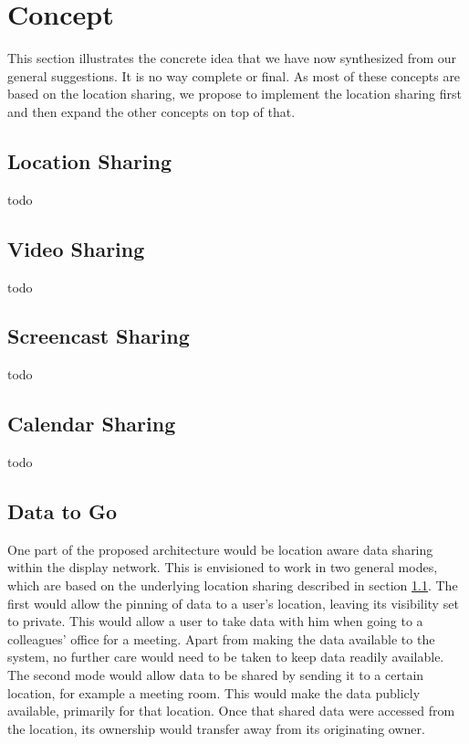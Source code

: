 \section{Concept}

This section illustrates the concrete idea that we have now synthesized from our general suggestions.
It is no way complete or final.
As most of these concepts are based on the location sharing, we propose to implement the location sharing first and then expand the other concepts on top of that.

\subsection{Location Sharing}
\label{location_sharing}

todo

\subsection{Video Sharing}

todo

\subsection{Screencast Sharing}

todo

\subsection{Calendar Sharing}

todo

\subsection{Data to Go}
\label{data2go}

One part of the proposed architecture would be location aware data sharing within the display network.
This is envisioned to work in two general modes, which are based on the underlying location sharing described in section \ref{location_sharing}.
The first would allow the pinning of data to a user's location, leaving its visibility set to private.
This would allow a user to take data with him when going to a colleagues' office for a meeting.
Apart from making the data available to the system, no further care would need to be taken to keep data readily available.
The second mode would allow data to be shared by sending it to a certain location, for example a meeting room.
This would make the data publicly available, primarily for that location.
Once that shared data were accessed from the location, its ownership would transfer away from its originating owner.

